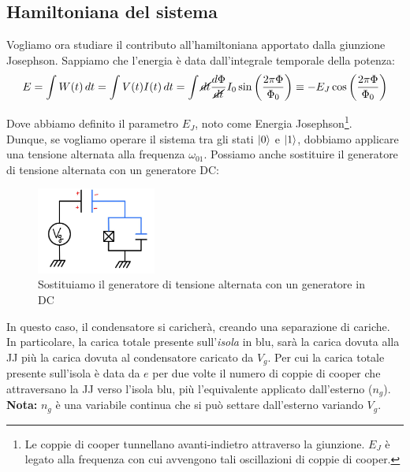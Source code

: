 \documentclass[10pt,a4paper]{article}
\begin{document}
\subsection{Hamiltoniana del sistema}
Vogliamo ora studiare il contributo all'hamiltoniana apportato dalla giunzione Josephson.
Sappiamo che l'energia è data dall'integrale temporale della potenza:
\begin{equation}
    E =  \int W(t) \,dt = \int V(t)I(t) \,dt = \int \cancel{dt} \dfrac{d\Phi}{\cancel{dt}} I_0 \sin\left(\dfrac{2\pi\Phi}{\Phi_0}\right) \equiv -E_J\cos\left(\dfrac{2\pi\Phi}{\Phi_0}\right)
\end{equation}

Dove abbiamo definito il parametro $E_J$, noto come Energia Josephson\footnote{Le coppie di cooper tunnellano avanti-indietro attraverso la giunzione. $E_J$ è legato alla frequenza con cui avvengono tali oscillazioni di coppie di cooper.}.\\



Dunque, se vogliamo operare il sistema tra gli stati $\ket{0}$ e $\ket{1}$, dobbiamo applicare una tensione alternata alla frequenza $\omega_{01}$.
Possiamo anche sostituire il generatore di tensione alternata con un generatore DC:

\begin{figure}[h]
    \centering
    \includegraphics[width=0.35\textwidth]{DC_island.JPG}
    \caption{Sostituiamo il generatore di tensione alternata con un generatore in DC}
    \label{dc}
\end{figure}
\FloatBarrier

In questo caso, il condensatore si caricherà, creando una separazione di cariche. In particolare, la carica totale presente sull'\textit{isola} in blu, sarà la carica dovuta alla JJ più la carica dovuta al condensatore caricato da $V_g$.
Per cui la carica totale presente sull'isola è data da $e$ per due volte il numero di coppie di cooper che attraversano la JJ verso l'isola blu, più l'equivalente applicato dall'esterno ($n_g$).\\
\textbf{Nota:} $n_g$ è una variabile continua che si può settare dall'esterno variando $V_g$.\\
\end{document}

